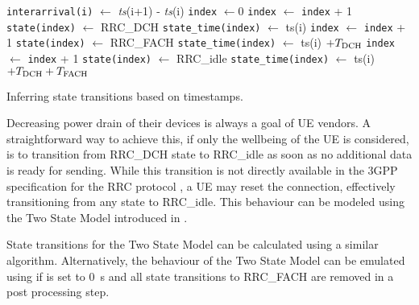 \begin{algorithm}
  \begin{algorithmic}
    \State \texttt{interarrival(i)} $\leftarrow$ \emph{ts}(i+1) - \emph{ts}(i)
    \State \texttt{index} $\leftarrow 0$
        \State \texttt{index} $\leftarrow$ \texttt{index} + 1
        \State \texttt{state(index)} $\leftarrow$ \gls{RRC_DCH}
        \State \texttt{state\_time(index)} $\leftarrow$ ts(i)
      \EndIf
        \State \texttt{index} $\leftarrow$ \texttt{index} + 1
        \State \texttt{state(index)} $\leftarrow$ \gls{RRC_FACH}
        \State \texttt{state\_time(index)} $\leftarrow$ ts(i) $+ T_{\text{DCH}}$
      \EndIf
        \State \texttt{index} $\leftarrow$ \texttt{index} + 1
        \State \texttt{state(index)} $\leftarrow$ \gls{RRC_idle}
        \State \texttt{state\_time(index)} $\leftarrow$ ts(i) $+ T_{\text{DCH}} + T_{\text{FACH}}$
      \EndIf
    \EndFor
  \end{algorithmic}
  \caption{Inferring  state transitions based on  timestamps.}
  \label{alg:network:network_traces:performance_evaluation:inferring_network_state:inference_algorithm}
\end{algorithm}

Decreasing power drain of their devices is always a goal of \gls{UE} vendors.
A straightforward way to achieve this, if only the wellbeing of the \gls{UE} is considered, is to transition from \gls{RRC_DCH} state to \gls{RRC_idle} as soon as no additional data is ready for sending.
While this transition is not directly available in the 3GPP specification for the \gls{RRC} protocol \cite{3GPP_RRC_Spec}, a \gls{UE} may reset the connection, effectively transitioning from any state to \gls{RRC_idle}.
This behaviour can be modeled using the Two State Model introduced in .

State transitions for the Two State Model can be calculated using a similar algorithm.
Alternatively, the behaviour of the Two State Model can be emulated using  if \TFACH is set to \SI{0}{\second} and all state transitions to \gls{RRC_FACH} are removed in a post processing step.

